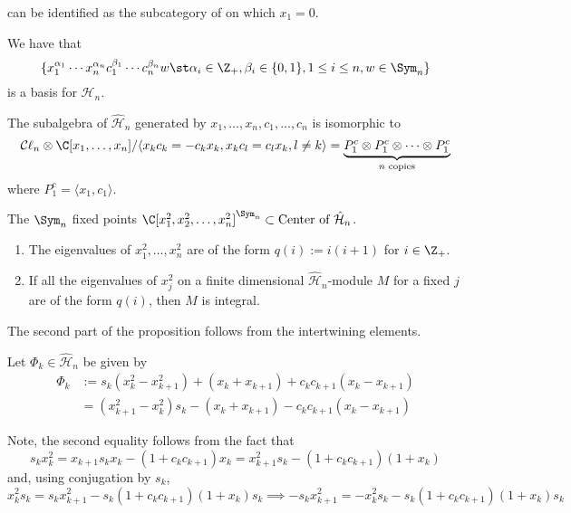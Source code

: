 \documentclass[11pt,leqno,oneside]{amsbook}
\renewcommand{\H}{\mathcal{H}}
\newcommand{\Cl}{\mathcal{C\ell}} %
\numberwithin{thm}{section}
\begin{document}
\catname{\(\H_n\)-Mod} can be identified as the subcategory of
\catname{\(\hat{\H}_n\)-Mod} on which \(x_1 = 0\).
\begin{thm}
  We have that \[
    \{x_1^{\alpha_1} \cdots x_n^{\alpha_n} c_1^{\beta_1}\cdots
    c_n^{\beta_n}w \st \alpha_i \in \Z_+, \beta_i \in \{0,1\}, 1 \leq
    i \leq n, w \in \Sym_n\}
  \]
  is a basis for \(\hat{\H}_n\).
\end{thm}
\begin{cor}
  The subalgebra of \(\hat{\H}_n\) generated by \(x_1,\ldots, x_n,
  c_1, \ldots, c_n\) is isomorphic to \[
    \Cl_n \otimes \C[x_1, \ldots, x_n] / \langle x_k c_k = -c_k x_k,
    x_k c_l = c_l x_k, l \neq k \rangle = \underbrace{P_1^c \otimes P_1^c \otimes
    \cdots \otimes P_1^c}_{n \text{ copies}}
\]
where \(P_1^c = \langle x_1,c_1 \rangle\). 
\end{cor}
\begin{prop}
  The \(\Sym_n\) fixed points \(\C[x_1^2,x_2^2,\ldots,x_n^2]^{\Sym_n}
  \subset \text{Center of }\hat{\H}_n\).
\end{prop}
\begin{prop}
  \begin{enumerate}
  \item The eigenvalues of \(x_1^2, \ldots, x_n^2\) are of the form
    \(q(i) := i(i+1)\) for \(i \in \Z_+\).
  \item If all the eigenvalues of \(x_j^2\) on a finite dimensional
    \(\hat{\H}_n\)-module \(M\) for a fixed \(j\) are of the form
    \(q(i)\), then \(M\) is integral.
  \end{enumerate}
\end{prop}
The second part of the proposition follows from the intertwining
elements.
\begin{defn}
  Let  \(\Phi_k \in \hat{\H}_n\) be given by
  \begin{align*}
    \Phi_k
    & := s_k(x_k^2-x_{k+1}^2) + (x_k + x_{k+1}) + c_k
      c_{k+1}(x_k-x_{k+1}) \\
    & = (x_{k+1}^2-x_k^2)s_k - (x_k + x_{k+1}) - c_k c_{k+1}(x_k-x_{k+1})
  \end{align*}
\end{defn}
Note, the second equality follows from the fact that \[
  s_k x_k^2 = x_{k+1} s_k x_k - (1+c_k c_{k+1}) x_k = x_{k+1}^2 s_k -
  (1+c_k c_{k+1})(1+x_k)
\]
and, using conjugation by \(s_k\), \[
  x_k^2 s_k = s_k x_{k+1}^2 - s_k (1+c_k c_{k+1})(1+x_k) s_k \implies
  - s_k x_{k+1}^2 = - x_k^2 s_k - s_k(1+c_k c_{k+1})(1+x_k) s_k
\]
\end{document}

